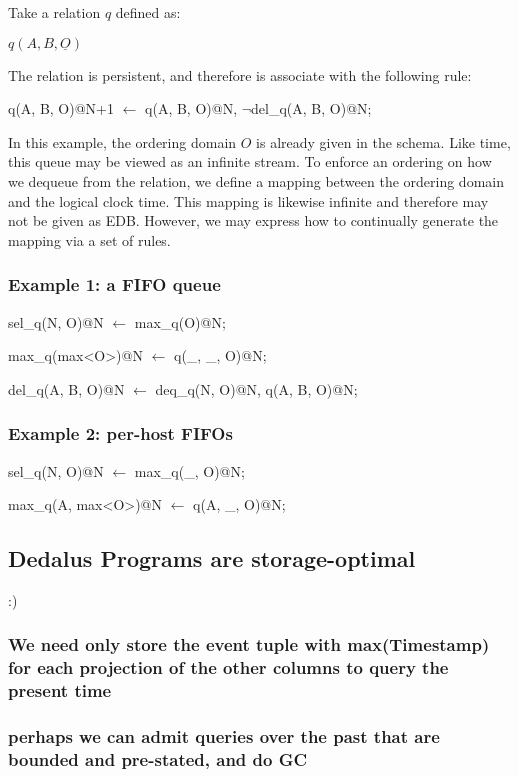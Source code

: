 Take a relation $q$ defined as:

$q(A, B, \underline{O})$

The relation is persistent, and therefore is associate with the following rule:

\begin{Dedalus}
q(A, B, O)@N+1 \(\leftarrow\)
  q(A, B, O)@N, 
  \(\lnot\)del\_q(A, B, O)@N;
\end{Dedalus}

In this example, the ordering domain $O$ is already given in the schema.  Like time, this queue may be viewed as an infinite stream.
To enforce an ordering on how we dequeue from the relation, we define a mapping between the ordering domain and the logical clock
time.  This mapping is likewise infinite and therefore may not be given as EDB.  However, we may express how to continually generate 
the mapping via a set of rules.

\subsubsection{Example 1: a FIFO queue}

\begin{Dedalus}
sel\_q(N, O)@N \(\leftarrow\)
  max\_q(O)@N;

max\_q(max<O>)@N \(\leftarrow\)
  q(\_, \_, O)@N;

del\_q(A, B, O)@N \(\leftarrow\)
  deq\_q(N, O)@N,
  q(A, B, O)@N;
\end{Dedalus}

\subsubsection{Example 2: per-host FIFOs}

\begin{Dedalus}
sel\_q(N, O)@N \(\leftarrow\)
  max\_q(_, O)@N; 

max\_q(A, max<O>)@N \(\leftarrow\)
q(A, \_, O)@N;
\end{Dedalus}


\subsection{Dedalus Programs are storage-optimal}

:)

\subsubsection{We need only store the event tuple with max(Timestamp) for each projection of the other columns to query the present time}


\subsubsection{perhaps we can admit queries over the past that are bounded and pre-stated, and do GC}
